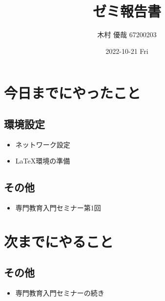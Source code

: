 \documentclass[uplatex, onecolumn, 10pt]{jsarticle}
\begin{document}
\title{\vspace{-40mm}\bf{\LARGE{ゼミ報告書}}}
\author{\vspace{-40mm}木村 優哉 67200203}
\date{2022-10-21 Fri}
\maketitle


\section{今日までにやったこと}

\subsection*{環境設定} 
\begin{itemize}
	\item ネットワーク設定
	\item {\LaTeX}環境の準備
\end{itemize}

\subsection*{その他}
\begin{itemize}
	\item 専門教育入門セミナー第1回
\end{itemize}


\section{次までにやること}

\subsection*{その他}
\begin{itemize}
	\item 専門教育入門セミナーの続き
\end{itemize}
\end{document}
